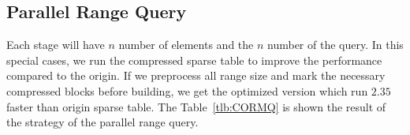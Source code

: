 

\subsection{Parallel Range Query}

Each stage will have $n$ number of elements and the $n$ number of the
query.  In this special cases, we run the compressed sparse table to
improve the performance compared to the origin.  If we preprocess all
range size and mark the necessary compressed blocks before building, we
get the optimized version which run $2.35$ faster than origin sparse
table. The Table~\ref{tlb:CORMQ} is shown the result of the strategy of
the parallel range query.

\iffalse 每一次有 $n$ 個元素和 $n$ 組詢問，針對這種特殊性質的問題，我
們運行樸素的 \texttt{CORMQ} (compressed RMQ) 得到效能改善，搭配可預測
的分析降低運算量 (參照 \texttt{CORMQ-opt})，得到更好的改善。在
\texttt{CORMQ-opt} 策略中，得到 $2.35 \times$ 倍的加速，結果如表
~\ref{tlb:CORMQ}。\fi


